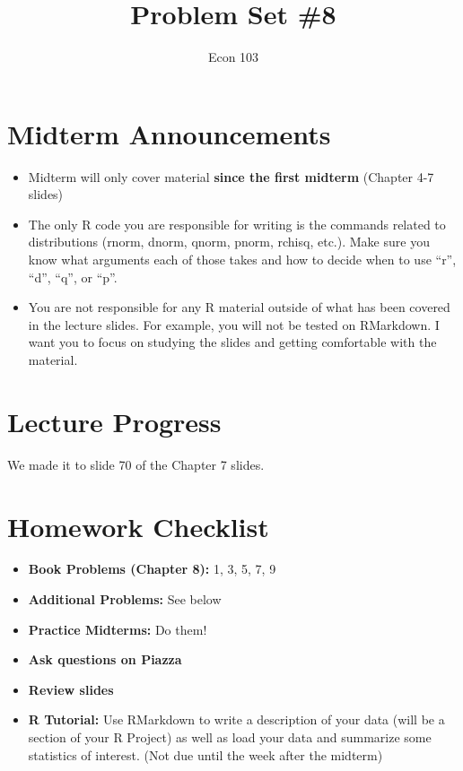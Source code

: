 \documentclass[addpoints,12pt]{exam}
\title{Problem Set \#8}
\author{Econ 103}
\date{}
\begin{document}
\maketitle

\section*{Midterm Announcements}

\begin{itemize}[label = $\square$]
	\item Midterm will only cover material \textbf{since the first midterm} (Chapter 4-7 slides)
	\item The only R code you are responsible for writing is the commands related to distributions (rnorm, dnorm, qnorm, pnorm, rchisq, etc.). Make sure you know what arguments each of those takes and how to decide when to use ``r'', ``d'', ``q'', or ``p''. 
	\item You are not responsible for any R material outside of what has been covered in the lecture slides. For example, you will not be tested on RMarkdown. I want you to focus on studying the slides and getting comfortable with the material.
\end{itemize}

\section*{Lecture Progress}
We made it to slide 70 of the Chapter 7 slides.

\section*{Homework Checklist}

\begin{itemize}[label = $\square$]
	\item \textbf{Book Problems (Chapter 8):} 1, 3, 5, 7, 9
	\item \textbf{Additional Problems: }See below
	\item \textbf{Practice Midterms: }Do them!
	\item \textbf{Ask questions on Piazza}
	\item\textbf{Review slides}
	\item\textbf{R Tutorial:} Use RMarkdown to write a description of your data (will be a section of your R Project) as well as load your data and summarize some statistics of interest. (Not due until the week after the midterm)
\end{itemize}
\end{document}
